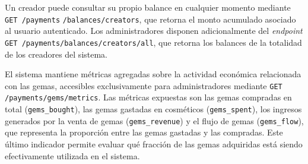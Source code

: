Un creador puede consultar su propio balance en cualquier momento mediante \texttt{GET /payments} \texttt{/balances/creators},
que retorna el monto acumulado asociado al usuario autenticado. Los administradores disponen adicionalmente del
\textit{endpoint} \texttt{GET /payments/balances/creators/all}, que retorna los balances de la totalidad de los
creadores del sistema.
\vspace{0.25cm}

El sistema mantiene métricas agregadas sobre la actividad económica relacionada con las gemas, accesibles
exclusivamente para administradores mediante \texttt{GET /payments/gems/metrics}. Las métricas expuestas son
las gemas compradas en total (\texttt{gems\_bought}), las gemas gastadas en cosméticos (\texttt{gems\_spent}),
los ingresos generados por la venta de gemas (\texttt{gems\_revenue}) y el flujo de gemas (\texttt{gems\_flow}),
que representa la proporción entre las gemas gastadas y las compradas. Este último indicador permite evaluar
qué fracción de las gemas adquiridas está siendo efectivamente utilizada en el sistema.
\vspace{0.25cm}
